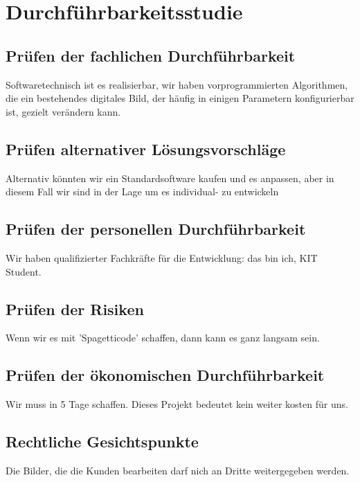 \documentclass[parskip=full]{scrartcl}
\begin{document}
\section{Durchführbarkeitsstudie}
\subsection{Prüfen der fachlichen Durchführbarkeit}
Softwaretechnisch ist es realisierbar, wir haben vorprogrammierten Algorithmen, die ein bestehendes digitales Bild, der häufig in einigen Parametern konfigurierbar ist, gezielt verändern kann.
\subsection{Prüfen alternativer Lösungsvorschläge}
Alternativ könnten wir ein Standardsoftware kaufen und es anpassen, aber in diesem Fall wir sind in der Lage um es individual- zu entwickeln
\subsection{Prüfen der personellen Durchführbarkeit}
Wir haben qualifizierter Fachkräfte für die Entwicklung: das bin ich, KIT Student.
\subsection{Prüfen der Risiken}
Wenn wir es mit 'Spagetticode' schaffen, dann kann es ganz langsam sein.
\subsection{Prüfen der ökonomischen Durchführbarkeit}
Wir muss in 5 Tage schaffen. Dieses Projekt bedeutet kein weiter kosten für uns.
\subsection{Rechtliche Gesichtspunkte}
Die Bilder, die die Kunden bearbeiten darf nich an Dritte weitergegeben werden.





%
%
\printnoidxglossaries
\end{document}
